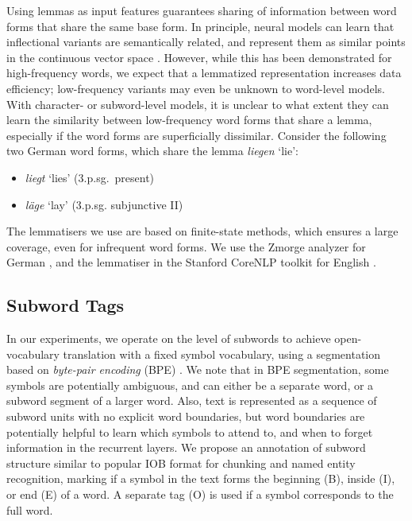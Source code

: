 \documentclass[11pt]{article}
\begin{document}
Using lemmas as input features guarantees sharing of information between word forms that share the same base form.
In principle, neural models can learn that inflectional variants are semantically related, and represent them as similar points in the continuous vector space \cite{conf/naacl/MikolovYZ13}.
However, while this has been demonstrated for high-frequency words, 
we expect that a lemmatized representation increases data efficiency; low-frequency variants may even be unknown to word-level models.
With character- or subword-level models, it is unclear to what extent they can learn the similarity between low-frequency word forms that share a lemma, especially if the word forms are superficially dissimilar.
Consider the following two German word forms, which share the lemma \textit{liegen} `lie':

\begin{itemize}
\item \textit{liegt} `lies' (3.p.sg.\ present)
\item \textit{läge} `lay' (3.p.sg. subjunctive II)
\end{itemize}

The lemmatisers we use are based on finite-state methods, which ensures a large coverage, even for infrequent word forms.
We use the Zmorge analyzer for German \cite{schmid2004,sennrich14},
and the lemmatiser in the Stanford CoreNLP toolkit for English \cite{DBLP:journals/nle/MinnenCP01}.

\subsection{Subword Tags}
\label{subword-sec}

In our experiments, we operate on the level of subwords to achieve open-vocabulary translation with a fixed symbol vocabulary,
using a segmentation based on \emph{byte-pair encoding} (BPE) \cite{DBLP:journals/corr/SennrichHB15}.
We note that in BPE segmentation, some symbols are potentially ambiguous, and can either be a separate word, or a subword segment of a larger word.
Also, text is represented as a sequence of subword units with no explicit word boundaries, but word boundaries are potentially helpful to learn which symbols to attend to, and when to forget information in the recurrent layers.
We propose an annotation of subword structure similar to popular IOB format for chunking and named entity recognition, marking if a symbol in the text forms the beginning (B), inside (I), or end (E) of a word.
A separate tag (O) is used if a symbol corresponds to the full word.
\end{document}
